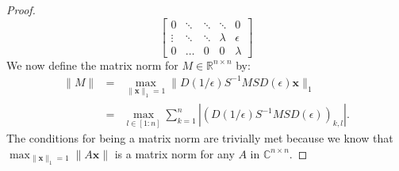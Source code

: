 \documentclass[a4paper,11pt]{report}
\newcommand{\R}{{\mathbb R}}
\newcommand{\C}{{\mathbb C}}
\begin{document}
\begin{proof}
$$\begin{bmatrix}
  0 & \ddots & \ddots & \ddots & 0\\
  \vdots & \ddots & \ddots & \lambda & \epsilon\\
  0 & \ldots & 0 & 0 & \lambda  \end{bmatrix}$$
  We now define the matrix norm for $M \in \R^{n\times n}$ by:
  \begin{eqnarray}
    \|M\| &=& \max_{\|\mathbf{x}\|_1 = 1} \| 
    D(1/\epsilon)S^{-1}MSD(\epsilon)\mathbf{x}\|_1\\
    &=& \max_{l \in [1:n]} \sum^n_{k=1} 
    |(D(1/\epsilon)S^{-1}MSD(\epsilon))_{k,l}|.
 \end{eqnarray}
 The conditions for being a matrix norm are trivially met because we know that $\max_{\|\mathbf{x}\|_1 = 1} \|A\mathbf{x}\|$ is a matrix norm for any $A$ in $\C^{n\times n}$.
\end{proof}
\end{document}
